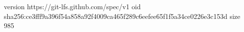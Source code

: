 version https://git-lfs.github.com/spec/v1
oid sha256:ce3fff9a396f54a858a92f4009ca465f289c6eefee65f1f5a34ce0226e3c153d
size 985
